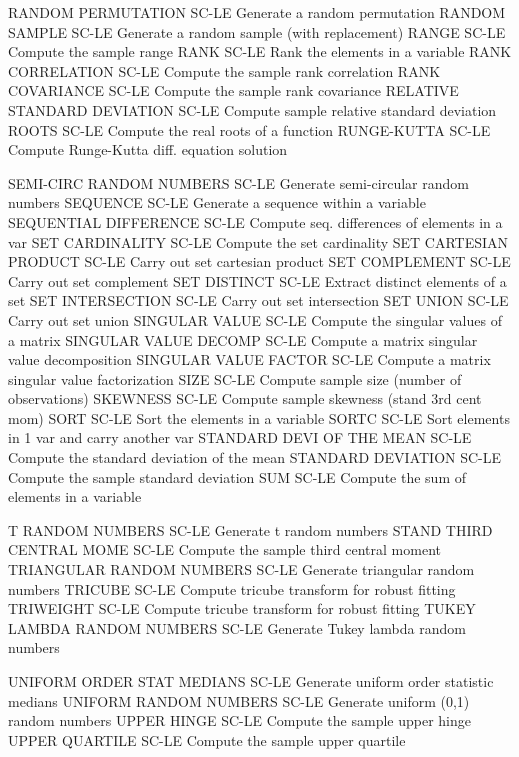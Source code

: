 RANDOM PERMUTATION          SC-LE Generate a random permutation
RANDOM SAMPLE               SC-LE Generate a random sample (with replacement)
RANGE                       SC-LE Compute the sample range
RANK                        SC-LE Rank the elements in a variable
RANK CORRELATION            SC-LE Compute the sample rank correlation
RANK COVARIANCE             SC-LE Compute the sample rank covariance
RELATIVE STANDARD DEVIATION SC-LE Compute sample relative standard deviation
ROOTS                       SC-LE Compute the real roots of a function
RUNGE-KUTTA                 SC-LE Compute Runge-Kutta diff. equation solution

SEMI-CIRC RANDOM NUMBERS    SC-LE Generate semi-circular random numbers
SEQUENCE                    SC-LE Generate a sequence within a variable
SEQUENTIAL DIFFERENCE       SC-LE Compute seq. differences of elements in a var
SET CARDINALITY             SC-LE Compute the set cardinality
SET CARTESIAN PRODUCT       SC-LE Carry out set cartesian product
SET COMPLEMENT              SC-LE Carry out set complement
SET DISTINCT                SC-LE Extract distinct elements of a set
SET INTERSECTION            SC-LE Carry out set intersection
SET UNION                   SC-LE Carry out set union
SINGULAR VALUE              SC-LE Compute the singular values of a matrix
SINGULAR VALUE DECOMP       SC-LE Compute a matrix singular value decomposition
SINGULAR VALUE FACTOR       SC-LE Compute a matrix singular value factorization
SIZE                        SC-LE Compute sample size (number of observations)
SKEWNESS                    SC-LE Compute sample skewness (stand 3rd cent mom)
SORT                        SC-LE Sort the elements in a variable
SORTC                       SC-LE Sort elements in 1 var and carry another var
STANDARD DEVI OF THE MEAN   SC-LE Compute the standard deviation of the mean
STANDARD DEVIATION          SC-LE Compute the sample standard deviation
SUM                         SC-LE Compute the sum of elements in a variable

T RANDOM NUMBERS            SC-LE Generate t random numbers
STAND THIRD CENTRAL MOME    SC-LE Compute the sample third central moment
TRIANGULAR RANDOM NUMBERS   SC-LE Generate triangular random numbers
TRICUBE                     SC-LE Compute tricube transform for robust fitting
TRIWEIGHT                   SC-LE Compute tricube transform for robust fitting
TUKEY LAMBDA RANDOM NUMBERS SC-LE Generate Tukey lambda random numbers

UNIFORM ORDER STAT MEDIANS  SC-LE Generate uniform order statistic medians
UNIFORM RANDOM NUMBERS      SC-LE Generate uniform (0,1) random numbers
UPPER HINGE                 SC-LE Compute the sample upper hinge
UPPER QUARTILE              SC-LE Compute the sample upper quartile

